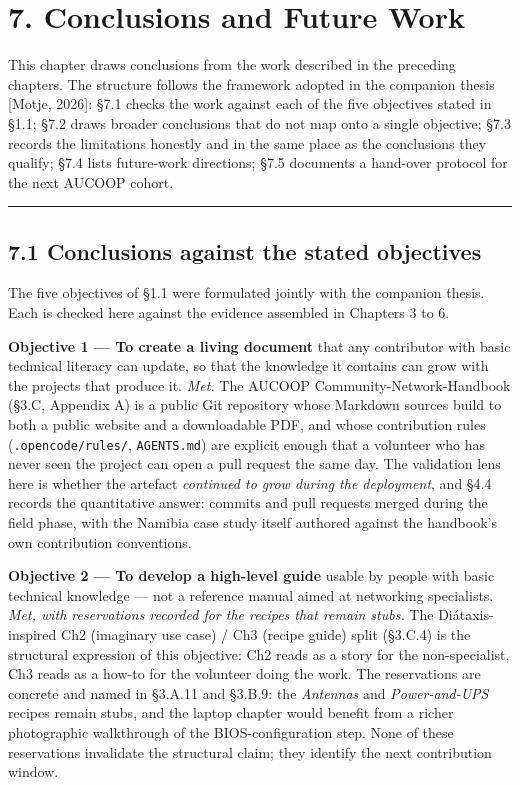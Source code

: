 \hypertarget{conclusions-and-future-work}{%
\section{7. Conclusions and Future
Work}\label{conclusions-and-future-work}}

This chapter draws conclusions from the work described in the preceding
chapters. The structure follows the framework adopted in the companion
thesis {[}Motje, 2026{]}: §7.1 checks the work against each of the five
objectives stated in §1.1; §7.2 draws broader conclusions that do not
map onto a single objective; §7.3 records the limitations honestly and
in the same place as the conclusions they qualify; §7.4 lists
future-work directions; §7.5 documents a hand-over protocol for the next
AUCOOP cohort.

\begin{center}\rule{0.5\linewidth}{0.5pt}\end{center}

\hypertarget{conclusions-against-the-stated-objectives}{%
\subsection{7.1 Conclusions against the stated
objectives}\label{conclusions-against-the-stated-objectives}}

The five objectives of §1.1 were formulated jointly with the companion
thesis. Each is checked here against the evidence assembled in Chapters
3 to 6.

\textbf{Objective 1 --- To create a living document} that any
contributor with basic technical literacy can update, so that the
knowledge it contains can grow with the projects that produce it.
\emph{Met.} The AUCOOP Community-Network-Handbook (§3.C, Appendix A) is
a public Git repository whose Markdown sources build to both a public
website and a downloadable PDF, and whose contribution rules
(\texttt{.opencode/rules/}, \texttt{AGENTS.md}) are explicit enough that
a volunteer who has never seen the project can open a pull request the
same day. The validation lens here is whether the artefact
\emph{continued to grow during the deployment}, and §4.4 records the
quantitative answer: commits and pull requests merged during the field
phase, with the Namibia case study itself authored against the
handbook's own contribution conventions.

\textbf{Objective 2 --- To develop a high-level guide} usable by people
with basic technical knowledge --- not a reference manual aimed at
networking specialists. \emph{Met, with reservations recorded for the
recipes that remain stubs.} The Diátaxis-inspired Ch2 (imaginary use
case) / Ch3 (recipe guide) split (§3.C.4) is the structural expression
of this objective: Ch2 reads as a story for the non-specialist, Ch3
reads as a how-to for the volunteer doing the work. The reservations are
concrete and named in §3.A.11 and §3.B.9: the \emph{Antennas} and
\emph{Power-and-UPS} recipes remain stubs, and the laptop chapter would
benefit from a richer photographic walkthrough of the BIOS-configuration
step. None of these reservations invalidate the structural claim; they
identify the next contribution window.


